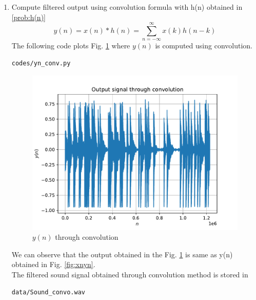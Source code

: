 \documentclass[journal,12pt,twocolumn]{IEEEtran}
\renewcommand\thesection{\arabic{section}}
\begin{document}
\begin{enumerate}[label=\thesection.\arabic*,ref=\thesection.\theenumi]
\\
\item Compute filtered output using convolution formula with h(n) obtained in \ref{prob:h(n)}
%
\begin{equation}
\label{eq:convolution}
y(n) = x(n)*h(n) = \sum_{n=-\infty}^{\infty}x(k)h(n-k)
\end{equation}
\solution The following code plots Fig. \ref{fig:yn_conv} where $y(n)$ is computed using convolution.
%
\begin{lstlisting}
codes/yn_conv.py
\end{lstlisting}
\begin{figure}[!ht]
\centering
\includegraphics[width=\columnwidth]{./figs/yn_conv}
\caption{$y(n)$ through convolution}
\label{fig:yn_conv}
\end{figure}
We can observe that the output obtained in the Fig. \ref{fig:yn_conv} is same as y(n) obtained in Fig. \ref{fig:xnyn}.
\\
The filtered sound signal obtained through convolution method is stored in
\begin{lstlisting}
data/Sound_convo.wav
\end{lstlisting}
\end{enumerate}
\end{document}
